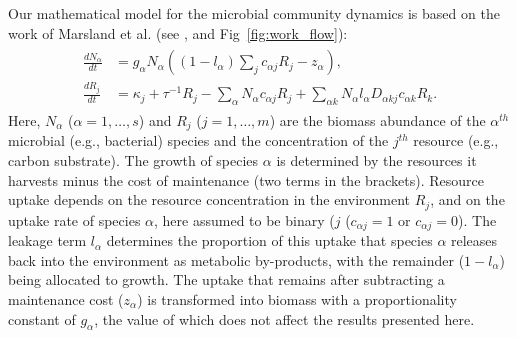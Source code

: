 \documentclass[10pt,letterpaper]{article}
\begin{document}
Our mathematical model for the microbial community dynamics is based on the work of Marsland et al. \cite{Marsland2019} (see , and Fig~\ref{fig:work_flow}):
\begin{align}
\begin{split}
    \frac{dN_\alpha }{dt} &= g_\alpha N_\alpha \left((1-l_{\alpha})\sum_j c_{\alpha j}R_j - z_\alpha \right),  \\
    \frac{dR_{j}}{dt} &= \kappa_j +\tau^{-1}R_j - \sum_\alpha N_\alpha c_{\alpha j}R_j + \sum_{\alpha k}N_\alpha l_{\alpha}D_{\alpha kj}c_{\alpha k}R_k. 
    \end{split}
\label{eq:Model}
\end{align}
Here, $N_\alpha$ ($\alpha  = 1, \dots, s$) and $R_j$ ($j  = 1, \dots, m$) are the biomass abundance of the $\alpha^{th}$ microbial (e.g., bacterial) species and the concentration of the $j^{th}$ resource (e.g., carbon substrate). The growth of species $ \alpha $ is determined by the resources it harvests minus the cost of maintenance (two terms in the brackets). Resource uptake depends on the resource concentration in the environment $ R_j $, and on the uptake rate of species $ \alpha  $, here assumed to be binary ($ j $ ($ c_{\alpha j} = 1 \text{ or } c_{\alpha j} = 0 $). The leakage term $l_{\alpha}$ determines the proportion of this uptake that species $\alpha$ releases back into the environment as metabolic by-products, with the remainder ($1-l_{\alpha}$) being allocated to growth. The uptake that remains after subtracting a maintenance cost ($z_{\alpha}$) is transformed into biomass with a proportionality constant of $g_\alpha$, the value of which does not affect the results presented here. 
\end{document}
